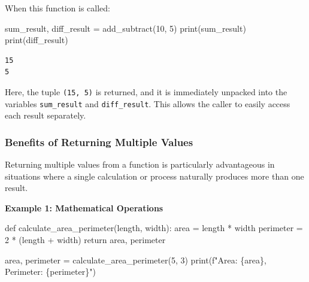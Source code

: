 \documentclass[
  letterpaper,
  DIV=11,
  numbers=noendperiod]{scrreprt}
\newenvironment{Shaded}{\begin{snugshade}}{\end{snugshade}}
\newcommand{\BuiltInTok}[1]{\textcolor[rgb]{0.00,0.23,0.31}{#1}}
\newcommand{\ControlFlowTok}[1]{\textcolor[rgb]{0.00,0.23,0.31}{#1}}
\newcommand{\DecValTok}[1]{\textcolor[rgb]{0.68,0.00,0.00}{#1}}
\newcommand{\KeywordTok}[1]{\textcolor[rgb]{0.00,0.23,0.31}{#1}}
\newcommand{\NormalTok}[1]{\textcolor[rgb]{0.00,0.23,0.31}{#1}}
\newcommand{\OperatorTok}[1]{\textcolor[rgb]{0.37,0.37,0.37}{#1}}
\newcommand{\SpecialCharTok}[1]{\textcolor[rgb]{0.37,0.37,0.37}{#1}}
\newcommand{\SpecialStringTok}[1]{\textcolor[rgb]{0.13,0.47,0.30}{#1}}
\begin{document}
When this function is called:

\begin{Shaded}
\begin{Highlighting}[]
\NormalTok{sum\_result, diff\_result }\OperatorTok{=}\NormalTok{ add\_subtract(}\DecValTok{10}\NormalTok{, }\DecValTok{5}\NormalTok{)}
\BuiltInTok{print}\NormalTok{(sum\_result)  }
\BuiltInTok{print}\NormalTok{(diff\_result)  }
\end{Highlighting}
\end{Shaded}

\begin{verbatim}
15
5
\end{verbatim}

Here, the tuple \texttt{(15,\ 5)} is returned, and it is immediately
unpacked into the variables \texttt{sum\_result} and
\texttt{diff\_result}. This allows the caller to easily access each
result separately.

\hypertarget{benefits-of-returning-multiple-values}{%
\subsubsection{Benefits of Returning Multiple
Values}\label{benefits-of-returning-multiple-values}}

Returning multiple values from a function is particularly advantageous
in situations where a single calculation or process naturally produces
more than one result.

\textbf{Example 1: Mathematical Operations}

\begin{Shaded}
\begin{Highlighting}[]
\KeywordTok{def}\NormalTok{ calculate\_area\_perimeter(length, width):}
\NormalTok{    area }\OperatorTok{=}\NormalTok{ length }\OperatorTok{*}\NormalTok{ width}
\NormalTok{    perimeter }\OperatorTok{=} \DecValTok{2} \OperatorTok{*}\NormalTok{ (length }\OperatorTok{+}\NormalTok{ width)}
    \ControlFlowTok{return}\NormalTok{ area, perimeter}

\NormalTok{area, perimeter }\OperatorTok{=}\NormalTok{ calculate\_area\_perimeter(}\DecValTok{5}\NormalTok{, }\DecValTok{3}\NormalTok{)}
\BuiltInTok{print}\NormalTok{(}\SpecialStringTok{f"Area: }\SpecialCharTok{\{}\NormalTok{area}\SpecialCharTok{\}}\SpecialStringTok{, Perimeter: }\SpecialCharTok{\{}\NormalTok{perimeter}\SpecialCharTok{\}}\SpecialStringTok{"}\NormalTok{)}
\end{Highlighting}
\end{Shaded}
\end{document}
